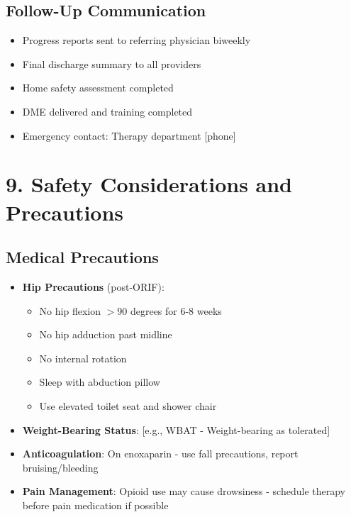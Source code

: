 \documentclass[11pt,letterpaper]{article}
\begin{document}
\subsection*{Follow-Up Communication}

\begin{itemize}[leftmargin=*]
    \item Progress reports sent to referring physician biweekly
    \item Final discharge summary to all providers
    \item Home safety assessment completed
    \item DME delivered and training completed
    \item Emergency contact: Therapy department [phone]
\end{itemize}

\section*{9. Safety Considerations and Precautions}

\subsection*{Medical Precautions}

\begin{itemize}[leftmargin=*]
    \item \textbf{Hip Precautions} (post-ORIF):
    \begin{itemize}
        \item No hip flexion $>$90 degrees for 6-8 weeks
        \item No hip adduction past midline
        \item No internal rotation
        \item Sleep with abduction pillow
        \item Use elevated toilet seat and shower chair
    \end{itemize}
    
    \item \textbf{Weight-Bearing Status}: [e.g., WBAT - Weight-bearing as tolerated]
    
    \item \textbf{Anticoagulation}: On enoxaparin - use fall precautions, report bruising/bleeding
    
    \item \textbf{Pain Management}: Opioid use may cause drowsiness - schedule therapy before pain medication if possible
\end{itemize}
\end{document}
